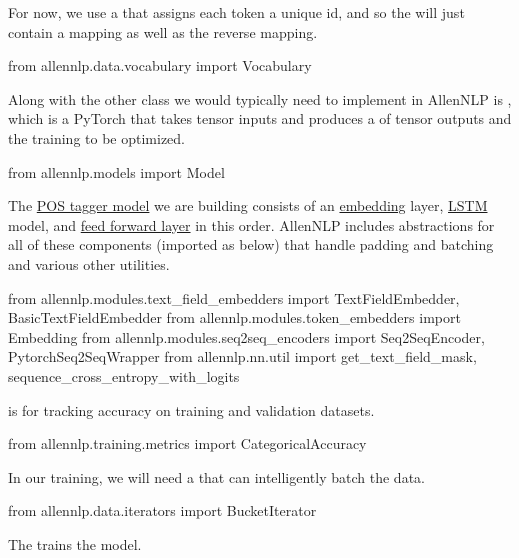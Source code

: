 For now, we use a  that assigns each token a unique id, and so the  will just contain a mapping  as well as the reverse mapping.

\begin{pythonCode}
from allennlp.data.vocabulary import Vocabulary
\end{pythonCode}

Along with  the other class we would typically need to implement in AllenNLP is , which is a PyTorch  that takes tensor inputs and produces a  of tensor outputs and the training  to be optimized.


\begin{pythonCode}
from allennlp.models import Model
\end{pythonCode}

The \hyperref[nlptask:postagging]{POS tagger model} we are building consists of an \hyperref[sec:WordEmbeddings]{embedding} layer, \hyperref[sec:LSTM]{LSTM} model, and \hyperref[sec:NeuralLM]{feed forward layer} in this order. AllenNLP includes abstractions for all of these components (imported as below) that handle padding and batching and various other utilities. 


\begin{pythonCode}
from allennlp.modules.text_field_embedders import TextFieldEmbedder, BasicTextFieldEmbedder
from allennlp.modules.token_embedders import Embedding
from allennlp.modules.seq2seq_encoders import Seq2SeqEncoder, PytorchSeq2SeqWrapper
from allennlp.nn.util import get_text_field_mask, sequence_cross_entropy_with_logits
\end{pythonCode}

 is for tracking accuracy on training and validation datasets.


\begin{pythonCode}
from allennlp.training.metrics import CategoricalAccuracy
\end{pythonCode}

In our training, we will need a  that can intelligently batch the data.


\begin{pythonCode}
from allennlp.data.iterators import BucketIterator
\end{pythonCode}

The  trains the model.

